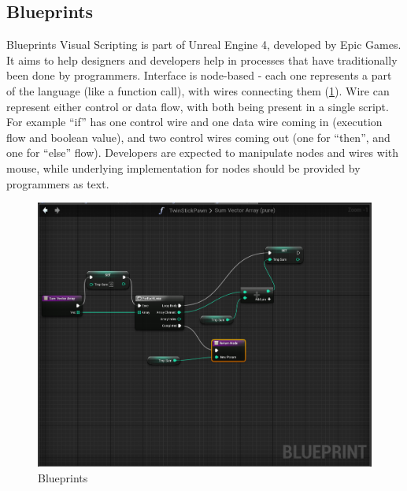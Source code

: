 \documentclass[11pt]{scrartcl}
\begin{document}
\subsection{Blueprints}
Blueprints Visual Scripting is part of Unreal Engine 4, developed by Epic Games.
It aims to help designers and developers help in processes that have
traditionally been done by programmers.
Interface is node-based - each one represents a part of the language (like a
function call), with wires connecting them (\ref{blueprints}).
Wire can represent either control or data flow, with both being present in a
single script.
For example “if” has one control wire and one data wire coming in (execution
flow and boolean value), and two control wires coming out (one for “then”, and
one for “else” flow).
Developers are expected to manipulate nodes and wires with mouse, while
underlying implementation for nodes should be provided by programmers as text.


\begin{figure}[hbt]
  \includegraphics[scale=0.3]{img/b-wires}
  \caption{Blueprints}
  \label{blueprints}
\end{figure}
\end{document}
